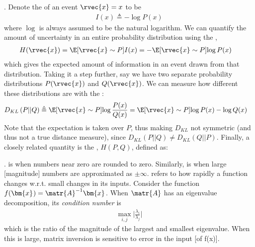 \documentclass[11pt]{article}
\renewcommand\vec[2][]{\bm{#2}_{#1}}
\newcommand\myspace[1][]{\vspace{#1\bigskipamount}}
\newcommand\p{\Needspace{10\baselineskip} \noindent}
\newcommand\tlab[1]{\tag{#1}\label{#1}}
\begin{document}
\myspace
\p {}. Denote the  of an event $\rvec{x} = x$ to be 
\begin{align}
	I(x) \triangleq - \log P(x)
\end{align}
where $\log$ is always assumed to be the natural logarithm. We can quantify the amount of uncertainty in an entire probability distribution using the ,
\begin{align}
	H(\rvec{x}) &= \E[\rvec{x} \sim P]{I(x)} = - \E[\rvec{x} \sim P]{\log P(x)}
\end{align}
which gives the expected amount of information in an event drawn from that distribution. Taking it a step further, say we have two separate probability distributions $P(\rvec{x})$ and $Q(\rvec{x})$. We can measure how different these distributions are with the :
\begin{align}
	D_{KL}\left( P || Q \right) &\triangleq \E[\rvec{x} \sim P]{\log \frac{P(x)}{Q(x)} } = \E[\rvec{x} \sim P]{\log P(x) - \log Q(x)}
\end{align}
Note that the expectation is taken over $P$, thus making $D_{KL}$ not symmetric (and thus not a true distance measure), since $D_{KL}(P || Q) \ne D_{KL}(Q || P)$. Finally, a closely related quantity is the , $H(P, Q)$, defined as:








\p {}.  is when numbers near zero are rounded to zero. Similarly,  is when large [magnitude] numbers are approximated as $\pm \infty$.  refers to how rapidly a function changes w.r.t. small changes in its inputs. Consider the function $f(\vec{x}) = \matr{A}^{-1}\vec{x}$. When $\matr{A}$ has an eigenvalue decomposition, its \textit{condition number} is
\begin{align}
\max_{i, j} \bigg| \frac{\lambda_i}{\lambda_j} \bigg| \tlab{4.2}
\end{align}
which is the ratio of the magnitude of the largest and smallest eigenvalue. When this is large, matrix inversion is sensitive to error in the input [of f(x)]. \\
\end{document}
